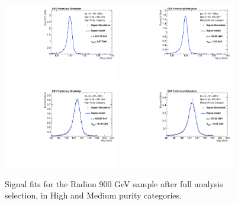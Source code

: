 \begin{figure}[h]
  \centering
  \includegraphics[width=0.45\textwidth]{figures/sec-signals/Rad900_signal_fit_mgg_cat0}\hfil
  \includegraphics[width=0.45\textwidth]{figures/sec-signals/Rad900_signal_fit_mgg_cat1}\hfil
  \includegraphics[width=0.45\textwidth]{figures/sec-signals/Rad900_signal_fit_mjj_cat0}\hfil
  \includegraphics[width=0.45\textwidth]{figures/sec-signals/Rad900_signal_fit_mjj_cat1}\hfil
  \caption{Signal fits for the Radion 900 GeV sample after full analysis selection, in High and Medium purity categories.}
  \label{fig:rad900}
\end{figure}


